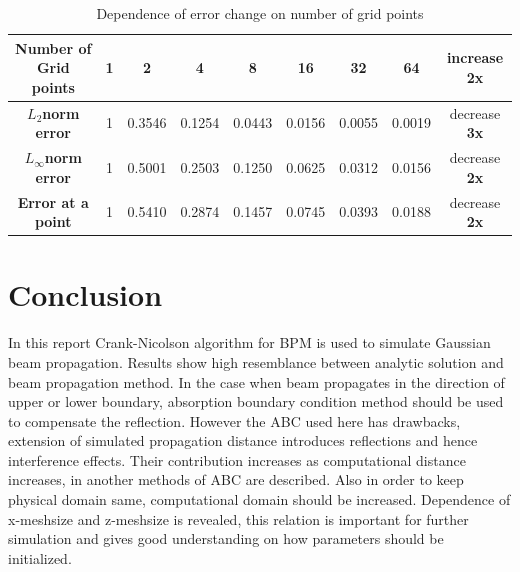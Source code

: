 \documentclass[a4paper]{article}
\begin{document}
	\begin{table}[h!]
		\hspace{-15mm}
		\begin{tabular}{c| c| c| c| c| c| c| c| c} 
			\textbf{ Number of Grid points}& 1 & 2 & 4 & 8 & 16 & 32 & 64 & increase \bf{2x}\\
			\hline
			\textbf{$L_{2}$norm error}& 1 & 0.3546 & 0.1254 & 0.0443 & 0.0156 & 0.0055 & 0.0019& decrease \bf{3x}\\
			\hline
			\textbf{$L_{\infty}$norm error}& 1 & 0.5001 & 0.2503 & 0.1250 & 0.0625 & 0.0312 & 0.0156& decrease \bf{2x}\\
			\hline
			\textbf{Error at a point}& 1 & 0.5410 & 0.2874 & 0.1457 & 0.0745 & 0.0393 & 0.0188& decrease \bf{2x}\\
			
		\end{tabular}
		\caption{\label{tab:Table2}Dependence of error change on number of grid points}
	\end{table}
	
	\newpage
	\section{Conclusion}
	In this report Crank-Nicolson algorithm for BPM is used to simulate Gaussian beam propagation. Results show high resemblance between analytic solution and beam propagation method. In the case when beam propagates in the direction of upper or lower boundary, absorption boundary condition method should be used to compensate the reflection. However the ABC used here has drawbacks, extension of simulated propagation distance introduces reflections and hence interference effects. Their contribution increases as computational distance increases, in \cite{pedrola2015beam} another methods of ABC are described. Also in order to keep physical domain same, computational domain should be increased. Dependence of x-meshsize and z-meshsize is revealed, this relation is important for further simulation and gives good understanding on how parameters should be initialized. 
	
	\newpage
	
	
	
	
	\newpage
	
\end{document}
